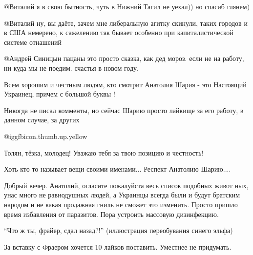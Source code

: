\begin{multicols}{2}
\begin{itemize}
 @Виталий  я в свою бытность, чуть в Нижний Тагил не уехал)) но спасиб глянем)

 @Виталий  ну, вы даёте, зачем мне либеральную агитку скинули, таких городов и
 в США немерено, к сажелению так бывает особенно при капиталистической системе
 отнашений

 @Андрей Синицын  пацаны это просто сказка, как дед мороз. если не на работу,
 ни куда мы не поедим. счастья в новом году.
\end{itemize} %

Всем хорошим и честным людям, кто смотрит Анатолия Шария - это Настоящий
Украинец, причем с большой буквы !

Никогда не писал комменты, но сейчас Шарию просто лайкище за его работу, в
данном случае, за других

 @igg{fbicon.thumb.up.yellow} 

Толян, тёзка, молодец! Уважаю тебя за твою позицию и честность!

Хоть кто то называет вещи своими именами... Респект Анатолию Шарию....


Добрый вечер. Анатолий, огласите пожалуйста весь список подобных живот ных,
унас много не равнодушных людей, а Украинцы всегда были и будут братским
народом и не какая продажная гниль не сможет это изменить. Просто пришло время
избавления от паразитов. Пора устроить массовую дизинфекцию.


\enquote{Что ж ты, фрайер, сдал назад?!} (иллюстрация переобувания синего эльфа)


За вставку с Фраером хочется 10 лайков поставить. Уместнее не придумать.

\end{multicols} %



